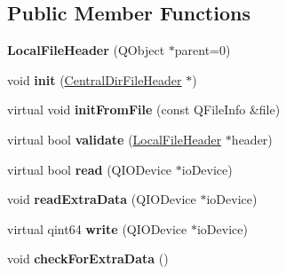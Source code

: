 \subsection*{Public Member Functions}
\begin{DoxyCompactItemize}
\item 
{\bfseries Local\+File\+Header} (Q\+Object $\ast$parent=0)\hypertarget{class_local_file_header_acaa7ee47d85dd5c386f2ce856fd7fc45}{}\label{class_local_file_header_acaa7ee47d85dd5c386f2ce856fd7fc45}

\item 
void {\bfseries init} (\hyperlink{class_central_dir_file_header}{Central\+Dir\+File\+Header} $\ast$)\hypertarget{class_local_file_header_a56f012880e2c05912c542fd55a84af59}{}\label{class_local_file_header_a56f012880e2c05912c542fd55a84af59}

\item 
virtual void {\bfseries init\+From\+File} (const Q\+File\+Info \&file)\hypertarget{class_local_file_header_adeef33267982114b0de527dbea19d006}{}\label{class_local_file_header_adeef33267982114b0de527dbea19d006}

\item 
virtual bool {\bfseries validate} (\hyperlink{class_local_file_header}{Local\+File\+Header} $\ast$header)\hypertarget{class_local_file_header_a9b9deb860fd0e12de2f9386b7b39c7ba}{}\label{class_local_file_header_a9b9deb860fd0e12de2f9386b7b39c7ba}

\item 
virtual bool {\bfseries read} (Q\+I\+O\+Device $\ast$io\+Device)\hypertarget{class_local_file_header_ab98f873f99674cd0ee1f502fa8dfabbe}{}\label{class_local_file_header_ab98f873f99674cd0ee1f502fa8dfabbe}

\item 
void {\bfseries read\+Extra\+Data} (Q\+I\+O\+Device $\ast$io\+Device)\hypertarget{class_local_file_header_ad94b61ae11160de695bcacf2ddd4b527}{}\label{class_local_file_header_ad94b61ae11160de695bcacf2ddd4b527}

\item 
virtual qint64 {\bfseries write} (Q\+I\+O\+Device $\ast$io\+Device)\hypertarget{class_local_file_header_ad1b8db67cd8b1bc40ddc4b18ec1c965b}{}\label{class_local_file_header_ad1b8db67cd8b1bc40ddc4b18ec1c965b}

\item 
void {\bfseries check\+For\+Extra\+Data} ()\hypertarget{class_local_file_header_ad96ffbe84518735db139e6208f1a1af4}{}\label{class_local_file_header_ad96ffbe84518735db139e6208f1a1af4}


\end{DoxyCompactItemize}
